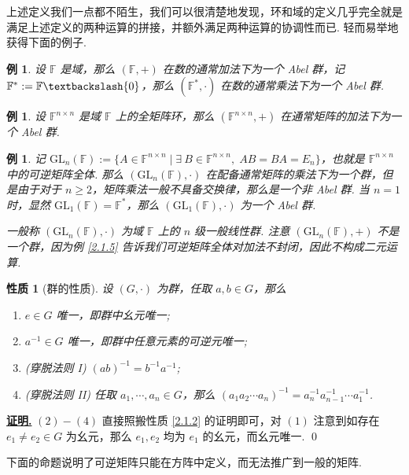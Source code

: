 \documentclass[10pt,openany]{article}
\theoremstyle{thmstyle} %
\theoremstyle{defstyle} %
\theoremstyle{prostyle} %
\newtheorem{property}[theorem]{性质}
\theoremstyle{exastyle}
\newtheorem{example}[theorem]{例}
\theoremstyle{remstyle}
\renewenvironment{proof}[1][证明]{\par\underline{\textbf{#1.}} \;\fangsong}{\qed\par}
\newcommand{\F}{\mathbb{F}}
\newcommand{\gfn}{\text{GL}_n(\mathbb{F})}
\newcommand{\n}{^{n \times n}}
\begin{document}
上述定义我们一点都不陌生，我们可以很清楚地发现，环和域的定义几乎完全就是满足上述定义的两种运算的拼接，并额外满足两种运算的协调性而已. 轻而易举地获得下面的例子.

\begin{example}
	设 \( \F \) 是域，那么 \( (\F,+) \) 在数的通常加法下为一个 Abel 群，记 \( \F^*:=\F \textbackslash \{0\} \)，那么 \( (\F^*,\cdot) \) 在数的通常乘法下为一个 Abel 群. 
\end{example}

\begin{example}
	设 \( \F\n \) 是域 \( \F \) 上的全矩阵环，那么 \( (\F\n,+) \) 在通常矩阵的加法下为一个 Abel 群. 
\end{example}

\begin{example}
	记 \( \gfn:=\{ A \in \F\n \mid \exists \ B \in \F\n, \; AB=BA=E_n \} \)，也就是 \( \F\n \) 中的可逆矩阵全体. 那么 \( (\gfn,\cdot) \) 在配备通常矩阵的乘法下为一个群，但是由于对于 \( n \geq 2 \)，矩阵乘法一般不具备交换律，那么是一个非 Abel 群. 当 \( n=1 \) 时，显然 \( \text{GL}_1(\mathbb{F})= \F^* \)，那么 \( (\text{GL}_1(\mathbb{F}),\cdot) \) 为一个 Abel 群. 
	
	一般称 \( (\gfn,\cdot) \) 为域 \( \F \) 上的 \( n \) 级一般线性群. 注意 \( (\gfn,+) \) 不是一个群，因为例 \ref{2.1.5} 告诉我们可逆矩阵全体对加法不封闭，因此不构成二元运算.
\end{example}

\begin{property}[群的性质]
	设 \( (G,\cdot) \) 为群，任取 \( a,b \in G \)，那么
	\begin{enumerate}
		\item \( e \in G \) 唯一，即群中幺元唯一;
		\item \( a^{-1} \in G \) 唯一，即群中任意元素的可逆元唯一;
		\item (穿脱法则 I) \( (ab)^{-1}=b^{-1}a^{-1} \);
		\item (穿脱法则 II) 任取 \( a_1,\cdots,a_n \in G \)，那么 \( (a_1a_2\cdots a_n)^{-1}=a_n^{-1}a_{n-1}^{-1}\cdots a_1^{-1} \).
	\end{enumerate}
\end{property}

\begin{proof}
	\( (2)-(4) \) 直接照搬性质 \ref{2.1.2} 的证明即可，对 \( (1) \) 注意到如存在 \( e_1 \neq e_2 \in G \) 为幺元，那么 \( e_1,e_2 \) 均为 \( e_1 \) 的幺元，而幺元唯一.
\end{proof}

下面的命题说明了可逆矩阵只能在方阵中定义，而无法推广到一般的矩阵. 
\end{document}
